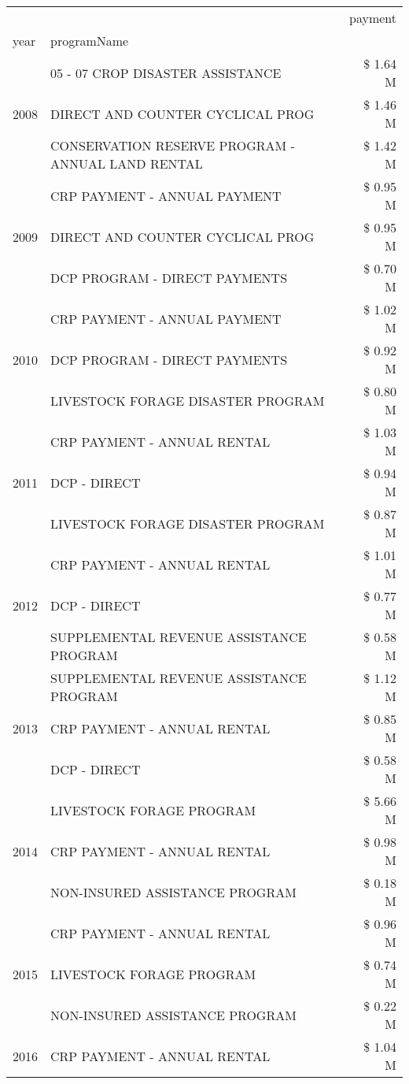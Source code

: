 \begin{tabular}{llr}
\toprule
 &  & payment \\
year & programName &  \\
\midrule
\multirow[t]{3}{*}{2008} & 05 - 07 CROP DISASTER ASSISTANCE & \$ 1.64 M \\
 & DIRECT AND COUNTER CYCLICAL PROG & \$ 1.46 M \\
 & CONSERVATION RESERVE PROGRAM - ANNUAL LAND RENTAL & \$ 1.42 M \\
\cline{1-3}
\multirow[t]{3}{*}{2009} & CRP PAYMENT - ANNUAL PAYMENT & \$ 0.95 M \\
 & DIRECT AND COUNTER CYCLICAL PROG & \$ 0.95 M \\
 & DCP PROGRAM - DIRECT PAYMENTS & \$ 0.70 M \\
\cline{1-3}
\multirow[t]{3}{*}{2010} & CRP PAYMENT - ANNUAL PAYMENT & \$ 1.02 M \\
 & DCP PROGRAM - DIRECT PAYMENTS & \$ 0.92 M \\
 & LIVESTOCK FORAGE DISASTER  PROGRAM & \$ 0.80 M \\
\cline{1-3}
\multirow[t]{3}{*}{2011} & CRP PAYMENT - ANNUAL RENTAL & \$ 1.03 M \\
 & DCP - DIRECT & \$ 0.94 M \\
 & LIVESTOCK FORAGE DISASTER PROGRAM & \$ 0.87 M \\
\cline{1-3}
\multirow[t]{3}{*}{2012} & CRP PAYMENT - ANNUAL RENTAL & \$ 1.01 M \\
 & DCP - DIRECT & \$ 0.77 M \\
 & SUPPLEMENTAL REVENUE ASSISTANCE PROGRAM & \$ 0.58 M \\
\cline{1-3}
\multirow[t]{3}{*}{2013} & SUPPLEMENTAL REVENUE ASSISTANCE PROGRAM & \$ 1.12 M \\
 & CRP PAYMENT - ANNUAL RENTAL & \$ 0.85 M \\
 & DCP - DIRECT & \$ 0.58 M \\
\cline{1-3}
\multirow[t]{3}{*}{2014} & LIVESTOCK FORAGE PROGRAM & \$ 5.66 M \\
 & CRP PAYMENT - ANNUAL RENTAL & \$ 0.98 M \\
 & NON-INSURED ASSISTANCE PROGRAM & \$ 0.18 M \\
\cline{1-3}
\multirow[t]{3}{*}{2015} & CRP PAYMENT - ANNUAL RENTAL & \$ 0.96 M \\
 & LIVESTOCK FORAGE PROGRAM & \$ 0.74 M \\
 & NON-INSURED ASSISTANCE PROGRAM & \$ 0.22 M \\
\cline{1-3}
\multirow[t]{3}{*}{2016} & CRP PAYMENT - ANNUAL RENTAL & \$ 1.04 M \\

\end{tabular}
